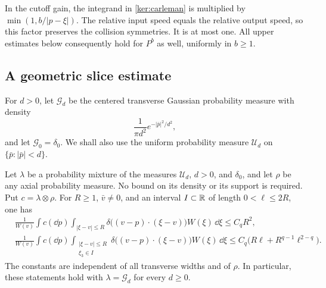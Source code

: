 In the cutoff gain, the integrand in \eqref{ker:carleman} is multiplied
by $\min(1,b/|p-\xi|)$. The relative input speed equals the relative
output speed, so this factor preserves the collision symmetries.
It is at most one. All upper estimates below consequently hold for
$P^b$ as well, uniformly in $b\geq1$.

\subsection{A geometric slice estimate}

For $d>0$, let $\mathcal G_d$ be the centered transverse Gaussian
probability measure with density
\[
 \frac{1}{\pi d^2}e^{-|\bar p|^2/d^2},
\]
and let $\mathcal G_0=\delta_0$. We shall also use the uniform
probability measure $\mathcal U_d$ on $\{\bar p:|\bar p|<d\}$.

\begin{lemma}
\label{ker:geometric-slice}
Let $\lambda$ be a probability mixture of the measures
$\mathcal U_d$, $d>0$, and $\delta_0$, and let $\rho$ be any axial
probability measure. No bound on its density or its support is
required. Put $c=\lambda\otimes\rho$. For $R\geq1$, $\bar v\ne0$,
and an interval $I\subset\mathbb R$ of length $0<\ell\leq2R$, one has
\begin{align}
 &\frac{1}{W(v)}\int c(\dd p)
   \int_{|\xi-v|\leq R}
    \delta\bigl((v-p)\cdot(\xi-v)\bigr)W(\xi)\,\dd\xi
     \leq C_q R^2,\label{ker:geometric-total}\\
 &\frac{1}{W(v)}\int c(\dd p)
   \int_{\substack{|\xi-v|\leq R\\ \xi_3\in I}}
    \delta\bigl((v-p)\cdot(\xi-v)\bigr)W(\xi)\,\dd\xi
     \leq C_q\bigl(R\ell+R^{q-1}\ell^{2-q}\bigr).
     \label{ker:geometric-interval}
\end{align}
The constants are independent of all transverse widths and of $\rho$.
In particular, these statements hold with $\lambda=\mathcal G_d$ for
every $d\geq0$.
\end{lemma}

